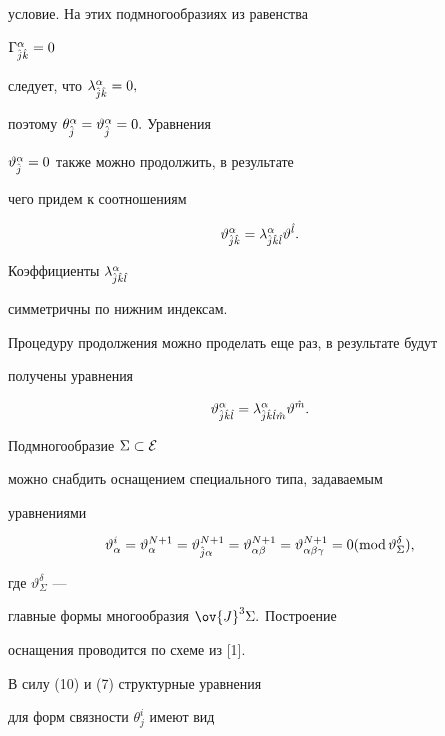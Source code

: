 условие. На этих подмногообразиях из равенства


$\Gamma^\alpha_{\Hat{j}\Hat{k}}=0$


следует, что $\lambda^\alpha_{\Hat{j}\Hat{k}}=0,$


поэтому $\theta^\alpha_{\Hat{j}}=\vartheta^\alpha_{\Hat{j}}=0.$ Уравнения


$\vartheta^\alpha_{\Hat{j}}=0$ также можно продолжить, в результате


чего придем к соотношениям


$$


\vartheta^\alpha_{\Hat{j}\Hat{k}}=


\lambda^\alpha_{\Hat{j}\Hat{k}\Hat{l}}\vartheta^{\Hat{l}}.


$$


Коэффициенты $\lambda^\alpha_{\Hat{j}\Hat{k}\Hat{l}}$


симметричны по нижним индексам.


Процедуру продолжения можно проделать еще раз, в результате будут


получены уравнения


$$


\vartheta^\alpha_{\Hat{j}\Hat{k}\Hat{l}}=


\lambda^\alpha_{\Hat{j}\Hat{k}\Hat{l}\Hat{m}}\vartheta^{\Hat{m}}.


$$





Подмногообразие $\Sigma\subset\cal E$


можно снабдить оснащением специального типа, задаваемым


уравнениями


\begin{equation}


\vartheta^i_\alpha=\vartheta^{N+1}_\alpha=


\vartheta^{N+1}_{\Hat{j}\alpha}=\vartheta^{N+1}_{\alpha\beta}=


\vartheta^{N+1}_{\alpha\beta\gamma}=0(\Mod \vartheta^\delta_\Sigma),


\end{equation}


где $\vartheta^\delta_\Sigma$ ---


главные формы многообразия $\ov{J}^3\Sigma.$ Построение


оснащения проводится по схеме из [1].


В силу (10) и (7) структурные уравнения


для форм связности $\theta^i_j$ имеют вид


